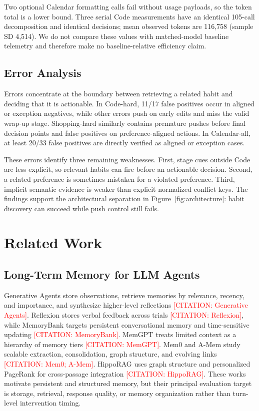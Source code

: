 \documentclass[sigconf,anonymous,review]{acmart}
\newcommand{\citetodo}[1]{\textcolor{red}{[CITATION: #1]}}
\begin{document}
Two optional Calendar formatting calls fail without usage payloads, so the token total is a lower bound.
Three serial Code measurements have an identical 105-call decomposition and identical decisions; mean observed tokens are 116,758 (sample SD 4,514).
We do not compare these values with matched-model baseline telemetry and therefore make no baseline-relative efficiency claim.

\subsection{Error Analysis}

Errors concentrate at the boundary between retrieving a related habit and deciding that it is actionable.
In Code-hard, 11/17 false positives occur in aligned or exception negatives, while other errors push on early edits and miss the valid wrap-up stage.
Shopping-hard similarly contains premature pushes before final decision points and false positives on preference-aligned actions.
In Calendar-all, at least 20/33 false positives are directly verified as aligned or exception cases.

These errors identify three remaining weaknesses.
First, stage cues outside Code are less explicit, so relevant habits can fire before an actionable decision.
Second, a related preference is sometimes mistaken for a violated preference.
Third, implicit semantic evidence is weaker than explicit normalized conflict keys.
The findings support the architectural separation in Figure~\ref{fig:architecture}: habit discovery can succeed while push control still fails.

\section{Related Work}

\subsection{Long-Term Memory for LLM Agents}

Generative Agents store observations, retrieve memories by relevance, recency, and importance, and synthesize higher-level reflections \citetodo{Generative Agents}.
Reflexion stores verbal feedback across trials \citetodo{Reflexion}, while MemoryBank targets persistent conversational memory and time-sensitive updating \citetodo{MemoryBank}.
MemGPT treats limited context as a hierarchy of memory tiers \citetodo{MemGPT}.
Mem0 and A-Mem study scalable extraction, consolidation, graph structure, and evolving links \citetodo{Mem0; A-Mem}.
HippoRAG uses graph structure and personalized PageRank for cross-passage integration \citetodo{HippoRAG}.
These works motivate persistent and structured memory, but their principal evaluation target is storage, retrieval, response quality, or memory organization rather than turn-level intervention timing.
\end{document}
